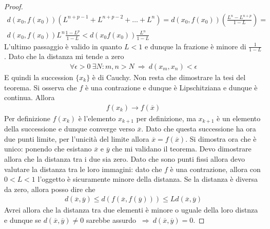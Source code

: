 \documentclass[a4paper, oneside]{book}
\begin{document}
\begin{proof}
\begin{gather*}
        d(x_0, f(x_0)) \left(L^{n + p - 1} + L^{n + p - 2}+ \dots + L^{n}   \right) = d(x_0, f(x_0)) \left(\frac{L^{n} - L^{n + p}  }{1 - L}\right) = \\
        d(x_0, f(x_0)) L^{n}\frac{1 - L^{p} }{1 - L}  < d(x_0 f(x_0)) \frac{L^{n} }{1 - L} 
    \end{gather*}
    L'ultimo passaggio è valido in quanto $L < 1$ e dunque la frazione è minore di $\frac{1}{1 - L}$. 
    Dato che la distanza mi tende a zero 
    \begin{gather*}
        \forall \epsilon > 0 \ \exists N : m, n > N  \ \Longrightarrow \ d(x_m, x_n) < \epsilon 
    \end{gather*}
    E quindi la succession $\{x_k\}$ è di Cauchy. Non resta che dimostrare
    la tesi del teorema. Si osserva che $f$ è una contrazione e dunque è
    Lipschitziana e dunque è continua. Allora
    \begin{gather*}
        f(x_k) \to f(\overline{x} )
    \end{gather*}
    Per definizione $f(x_k)$ è l'elemento $x_{k + 1}$ per definizione, ma $x_{k + 1}$ è
    un elemento della successione e dunque converge verso $\overline{x}$. Dato che questa successione
    ha ora due punti limite, per l'unicità del limite allora $\overline{x} = f(\overline{x} )$. Si dimostra ora che
    è unico: ponendo che esistano $\overline{x}$ e $\overline{y}$ che mi validano il teorema.
    Devo dimostrare allora che la distanza tra i due sia zero. Dato che sono
    punti fissi allora devo valutare la distanza tra le loro immagini: dato che
    $f$ è una contrazione, allora con $0 < L < 1$ l'oggetto è sicuramente minore
    della distanza. Se la distanza è diversa da zero, allora posso dire
    che 
    \begin{gather*}
        d(\overline{x}, \overline{y}  ) \leq d(f(\overline{x}, f(\overline{y})  )) \leq L d(\overline{x}, \overline{y}  )
    \end{gather*}     
    Avrei allora che la distanza tra due elementi è minore o uguale della loro distnza e dunque
    se $d(\overline{x}, \overline{y}  ) \neq 0$ sarebbe assurdo
    $\ \Longrightarrow \ d(\overline{x}, \overline{y}  ) = 0$. 
\end{proof}
\end{document}
